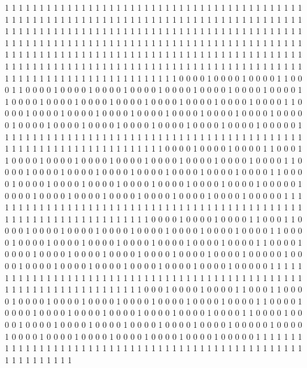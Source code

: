 1 1 1 1 1 1 1 1 1 1 1 1 1 1 1 1 1 1 1 1
1 1 1 1 1 1 1 1 1 1 1 1 1 1 1 1 1 1 1 1
1 1 1 1 1 1 1 1 1 1 1 1 1 1 1 1 1 1 1 1
1 1 1 1 1 1 1 1 1 1 1 1 1 1 1 1 1 1 1 1
1 1 1 1 1 1 1 1 1 1 1 1 1 1 1 1 1 1 1 1
1 1 1 1 1 1 1 1 1 1 1 1 1 1 1 1 1 1 1 1
1 1 1 1 1 1 1 1 1 1 1 1 1 1 1 1 1 1 1 1
1 1 1 1 1 1 1 1 1 1 1 1 1 1 1 1 1 1 1 1
1 1 1 1 1 1 1 1 1 1 1 1 1 1 1 1 1 1 1 1
1 1 1 1 1 1 1 1 1 1 1 1 1 1 1 1 1 1 1 1
1 1 1 1 1 1 1 1 1 1 1 1 1 1 1 1 1 1 1 1
1 1 1 1 1 1 1 1 1 1 1 1 1 1 1 1 1 1 1 1
1 1 1 1 1 1 1 1 1 1 1 1 1 1 1 1 1 1 1 1
1 1 1 1 1 1 1 1 1 1 1 1 1 1 1 1 1 1 1 1
1 1 1 0 0 0 0 1 0 0 0 0 1 0 0 0 0 1 1 0
0 0 1 1 0 0 0 0 1 0 0 0 0 1 0 0 0 0 1 0
0 0 0 1 0 0 0 0 1 0 0 0 0 1 0 0 0 0 1 0
0 0 0 1 1 0 0 0 0 1 0 0 0 0 1 0 0 0 0 1
0 0 0 0 1 0 0 0 0 1 0 0 0 0 1 0 0 0 0 1
0 0 0 0 1 1 0 0 0 0 1 0 0 0 0 1 0 0 0 0
1 0 0 0 0 1 0 0 0 0 1 0 0 0 0 1 0 0 0 0
1 0 0 0 0 1 0 0 0 0 0 1 0 0 0 0 1 0 0 0
0 1 0 0 0 0 1 0 0 0 0 1 0 0 0 0 1 0 0 0
0 1 0 0 0 0 1 0 0 0 0 0 1 1 1 1 1 1 1 1
1 1 1 1 1 1 1 1 1 1 1 1 1 1 1 1 1 1 1 1
1 1 1 1 1 1 1 1 1 1 1 1 1 1 1 1 1 1 1 1
1 1 1 1 1 1 1 1 1 1 1 1 1 1 1 1 1 1 1 0
0 0 0 1 0 0 0 0 1 0 0 0 0 1 1 0 0 0 1 1
0 0 0 0 1 0 0 0 0 1 0 0 0 0 1 0 0 0 0 1
0 0 0 0 1 0 0 0 0 1 0 0 0 0 1 0 0 0 0 1
1 0 0 0 0 1 0 0 0 0 1 0 0 0 0 1 0 0 0 0
1 0 0 0 0 1 0 0 0 0 1 0 0 0 0 1 0 0 0 0
1 1 0 0 0 0 1 0 0 0 0 1 0 0 0 0 1 0 0 0
0 1 0 0 0 0 1 0 0 0 0 1 0 0 0 0 1 0 0 0
0 1 0 0 0 0 0 1 0 0 0 0 1 0 0 0 0 1 0 0
0 0 1 0 0 0 0 1 0 0 0 0 1 0 0 0 0 1 0 0
0 0 1 0 0 0 0 0 1 1 1 1 1 1 1 1 1 1 1 1
1 1 1 1 1 1 1 1 1 1 1 1 1 1 1 1 1 1 1 1
1 1 1 1 1 1 1 1 1 1 1 1 1 1 1 1 1 1 1 1
1 1 1 1 1 1 1 1 1 1 1 1 1 1 1 0 0 0 0 1
0 0 0 0 1 0 0 0 0 1 1 0 0 0 1 1 0 0 0 0
1 0 0 0 0 1 0 0 0 0 1 0 0 0 0 1 0 0 0 0
1 0 0 0 0 1 0 0 0 0 1 0 0 0 0 1 1 0 0 0
0 1 0 0 0 0 1 0 0 0 0 1 0 0 0 0 1 0 0 0
0 1 0 0 0 0 1 0 0 0 0 1 0 0 0 0 1 1 0 0
0 0 1 0 0 0 0 1 0 0 0 0 1 0 0 0 0 1 0 0
0 0 1 0 0 0 0 1 0 0 0 0 1 0 0 0 0 1 0 0
0 0 0 1 0 0 0 0 1 0 0 0 0 1 0 0 0 0 1 0
0 0 0 1 0 0 0 0 1 0 0 0 0 1 0 0 0 0 1 0
0 0 0 0 1 1 1 1 1 1 1 1 1 1 1 1 1 1 1 1
1 1 1 1 1 1 1 1 1 1 1 1 1 1 1 1 1 1 1 1
1 1 1 1 1 1 1 1 1 1 1 1 1 1 1 1 1 1 1 1
1 1 1 1 1 1 1 1 1 1 1 1 0 0 0 1 0 0 0 0
1 0 0 0 0 1 1 0 0 0 1 1 0 0 0 0 1 0 0 0
0 1 0 0 0 0 1 0 0 0 0 1 0 0 0 0 1 0 0 0
0 1 0 0 0 0 1 0 0 0 0 1 1 0 0 0 0 1 0 0
0 0 1 0 0 0 0 1 0 0 0 0 1 0 0 0 0 1 0 0
0 0 1 0 0 0 0 1 0 0 0 0 1 1 0 0 0 0 1 0
0 0 0 1 0 0 0 0 1 0 0 0 0 1 0 0 0 0 1 0
0 0 0 1 0 0 0 0 1 0 0 0 0 1 0 0 0 0 0 1
0 0 0 0 1 0 0 0 0 1 0 0 0 0 1 0 0 0 0 1
0 0 0 0 1 0 0 0 0 1 0 0 0 0 1 0 0 0 0 0
1 1 1 1 1 1 1 1 1 1 1 1 1 1 1 1 1 1 1 1
1 1 1 1 1 1 1 1 1 1 1 1 1 1 1 1 1 1 1 1
1 1 1 1 1 1 1 1 1 1 1 1 1 1 1 1 1 1 1 1

